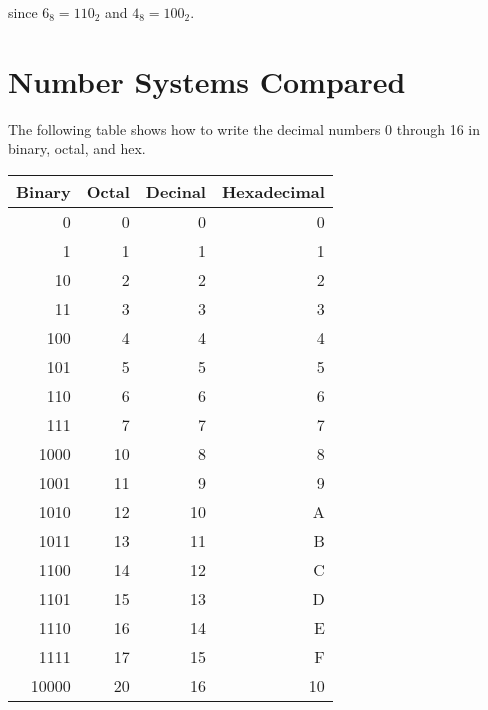 since $6_8 = 110_2$ and $4_8 = 100_2$.

\section*{Number Systems Compared}

The following table shows how to write the decimal numbers 0 through 16 in binary, octal, and hex.

\begin{center}
\begin{tabular}{rrrr}
\textbf{Binary} & \textbf{Octal} & \textbf{Decinal} & \textbf{Hexadecimal}\\
\hline
0 & 0 & 0 & 0\\
1 & 1 & 1 & 1\\
10 & 2 & 2 & 2\\
11 & 3 & 3 & 3\\
100 & 4 & 4 & 4\\
101 & 5 & 5 & 5\\
110 & 6 & 6 & 6\\
111 & 7 & 7 & 7\\
1000 & 10 & 8 & 8\\
1001 & 11 & 9 & 9\\
1010 & 12 & 10 & A\\
1011 & 13 & 11 & B\\
1100 & 14 & 12 & C\\
1101 & 15 & 13 & D\\
1110 & 16 & 14 & E\\
1111 & 17 & 15 & F\\
10000 & 20 & 16 & 10\\
\end{tabular}
\end{center}
